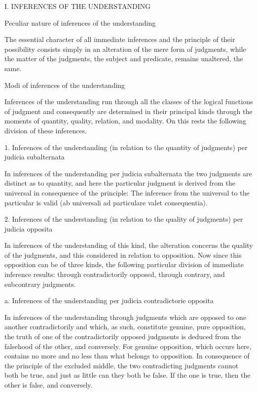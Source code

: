 I. INFERENCES OF THE UNDERSTANDING

Peculiar nature of inferences of the understanding

The essential character of all immediate inferences
and the principle of their possibility consists simply in
an alteration of the mere form of judgments,
while the matter of the judgments,
the subject and predicate,
remains unaltered, the same.

Modi of inferences of the understanding

Inferences of the understanding run through
all the classes of the logical functions of judgment
and consequently are determined in their principal kinds
through the moments of quantity, quality, relation, and modality.
On this rests the following division of these inferences.

1.  Inferences of the understanding
    (in relation to the quantity of judgments)
    per judicia subalternata

In inferences of the understanding per judicia subalternata
the two judgments are distinct as to quantity,
and here the particular judgment is derived from the universal
in consequence of the principle:
The inference from the universal to the particular is valid
(ab universali ad particulare valet consequentia).

2.  Inferences of the understanding
    (in relation to the quality of judgments)
    per judicia opposita

In inferences of the understanding of this kind,
the alteration concerns the quality of the judgments,
and this considered in relation to opposition.
Now since this opposition can be of three kinds,
the following particular division of immediate inference results:
through contradictorily opposed,
through contrary,
and subcontrary judgments.

a.  Inferences of the understanding
    per judicia contradictorie opposita

In inferences of the understanding through judgments
which are opposed to one another contradictorily
and which, as such, constitute genuine, pure opposition,
the truth of one of the contradictorily opposed judgments
is deduced from the falsehood of the other, and conversely.
For genuine opposition, which occurs here,
contains no more and no less than what belongs to opposition.
In consequence of the principle of the excluded middle,
the two contradicting judgments cannot both be true,
and just as little can they both be false.
If the one is true, then the other is false, and conversely.

